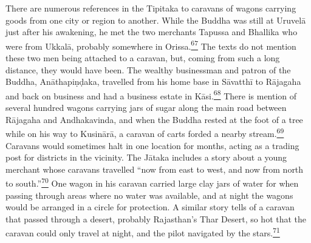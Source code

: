 There are numerous references in the Tipitaka to caravans of wagons
carrying goods from one city or region to another. While the Buddha was
still at Uruvelā just after his awakening, he met the two merchants
Tapussa and Bhallika who were from Ukkalā, probably somewhere in
Orissa.\label{footprints_split_006.html_fnref67}\hyperref[footprints_split_024.htmlux5cux23fn67]{\textsuperscript{67}}
The texts do not mention these two men being attached to a caravan, but,
coming from such a long distance, they would have been. The wealthy
businessman and patron of the Buddha, Anāthapiṇḍaka, travelled from his
home base in Sāvatthī to Rājagaha and back on business and had a
business estate in
Kāsi.\label{footprints_split_006.html_fnref68}\hyperref[footprints_split_024.htmlux5cux23fn68]{\textsuperscript{68}}
There is mention of several hundred wagons carrying jars of sugar along
the main road between Rājagaha and Andhakavinda, and when the Buddha
rested at the foot of a tree while on his way to Kusinārā, a caravan of
carts forded a nearby
stream.\label{footprints_split_006.html_fnref69}\hyperref[footprints_split_024.htmlux5cux23fn69]{\textsuperscript{69}}
Caravans would sometimes halt in one location for months, acting as a
trading post for districts in the vicinity. The Jātaka includes a story
about a young merchant whose caravans travelled ``now from east to west,
and now from north to
south.''\label{footprints_split_006.html_fnref70}\hyperref[footprints_split_024.htmlux5cux23fn70]{\textsuperscript{70}}
One wagon in his caravan carried large clay jars of water for when
passing through areas where no water was available, and at night the
wagons would be arranged in a circle for protection. A similar story
tells of a caravan that passed through a desert, probably Rajasthan's
Thar Desert, so hot that the caravan could only travel at night, and the
pilot navigated by the
stars.\label{footprints_split_006.html_fnref71}\hyperref[footprints_split_024.htmlux5cux23fn71]{\textsuperscript{71}}

